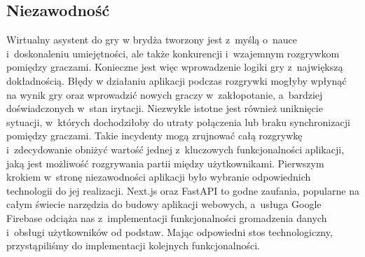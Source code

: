 \subsection{Niezawodność}
Wirtualny asystent do gry w brydża tworzony jest z~myślą o~nauce
i~doskonaleniu umiejętności, ale także konkurencji i~wzajemnym
rozgrywkom pomiędzy graczami. Konieczne jest więc wprowadzenie logiki
gry z~największą dokładnością. Błędy w działaniu aplikacji podczas
rozgrywki mogłyby wpłynąć na wynik gry oraz wprowadzić nowych graczy
w~zakłopotanie, a~bardziej doświadczonych w~stan irytacji.
Niezwykle istotne jest również uniknięcie sytuacji, w~których
dochodziłoby do utraty połączenia lub braku synchronizacji pomiędzy
graczami. Takie incydenty mogą zrujnować całą rozgrywkę i~zdecydowanie
obniżyć wartość jednej z~kluczowych funkcjonalności aplikacji, jaką
jest możliwość rozgrywania partii między użytkownikami.
Pierwszym krokiem w~stronę niezawodności aplikacji było wybranie
odpowiednich technologii do jej realizacji. Next.js oraz FastAPI %
to godne zaufania, popularne na całym świecie narzędzia do budowy
aplikacji webowych, a~usługa Google Firebase odciąża nas z~implementacji
funkcjonalności gromadzenia danych i~obsługi użytkowników od podstaw.
Mając odpowiedni stos technologiczny, przystąpiliśmy do implementacji
kolejnych funkcjonalności.

